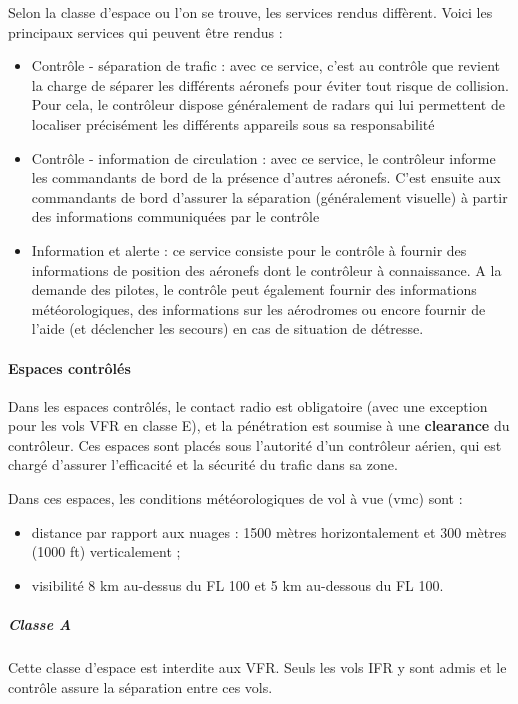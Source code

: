 		Selon la classe d'espace ou l'on se trouve, les services rendus diffèrent. Voici les principaux services qui peuvent être rendus :
		\begin{itemize}
			\item Contrôle - séparation de trafic : avec ce service, c'est au contrôle que revient la charge de séparer les différents aéronefs pour éviter tout risque de collision. Pour cela, le contrôleur dispose généralement de radars qui lui permettent de localiser précisément les différents appareils sous sa responsabilité
			\item Contrôle - information de circulation : avec ce service, le contrôleur informe les commandants de bord de la présence d'autres aéronefs. C'est ensuite aux commandants de bord d'assurer la séparation (généralement visuelle) à partir des informations communiquées par le contrôle
			\item Information et alerte : ce service consiste pour le contrôle à fournir des informations de position des aéronefs dont le contrôleur à connaissance. A la demande des pilotes, le contrôle peut également fournir des informations météorologiques, des informations sur les aérodromes ou encore fournir de l'aide (et déclencher les secours) en cas de situation de détresse.
		\end{itemize}
		
		\paragraph{Espaces contrôlés}
		Dans les espaces contrôlés, le contact radio est obligatoire (avec une exception pour les vols VFR en classe E), et la pénétration est soumise à une \textbf{clearance} du contrôleur. Ces espaces sont placés sous l'autorité d'un contrôleur aérien, qui est chargé d'assurer l'efficacité et la sécurité du trafic dans sa zone.
		
		Dans ces espaces, les conditions météorologiques de vol à vue (\acrshort{vmc}) sont :
		\begin{itemize}
		\item distance par rapport aux nuages : 1500 mètres horizontalement et 300 mètres (1000 ft) verticalement ;
		\item visibilité 8 km au-dessus du FL 100 et 5 km au-dessous du FL 100. 
		\end{itemize}
		
		\subparagraph{Classe A}
		Cette classe d'espace est interdite aux VFR. Seuls les vols IFR y sont admis et le contrôle assure la séparation entre ces vols.
		
